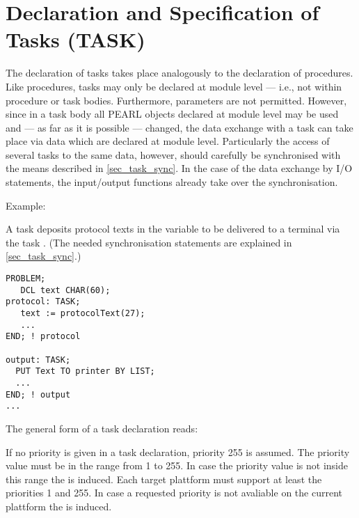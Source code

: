 \section{Declaration and Specification of Tasks (TASK)}   %
\label{sec_task_dcl}

The declaration of tasks takes place analogously to the declaration of
procedures.
Like procedures, tasks may only be declared at
module level --- i.e., not within procedure or task bodies. Furthermore,
parameters are not permitted. However, since in a task body all PEARL
objects declared at module level may be used and --- as far as it is
possible --- changed, the data exchange with a task can take place via
data which are declared at module level. Particularly the access of
several tasks to the same data, however, should carefully be
synchronised with the means described in \ref{sec_task_sync}. In the case of the data 
exchange by I/O statements, the input/output functions
already take over the synchronisation.

Example:

A task  deposits protocol texts in the variable 
 to be
delivered to a terminal via the task .
 (The needed synchronisation
statements are explained in \ref{sec_task_sync}.)

\begin{lstlisting}
PROBLEM;
   DCL text CHAR(60);
protocol: TASK; 
   text := protocolText(27);
   ...
END; ! protocol 

output: TASK;
  PUT Text TO printer BY LIST;
  ...
END; ! output
...
\end{lstlisting}

The general form of a task declaration reads:

\begin{grammarframe}



\end{grammarframe}

If no priority is given in a task declaration, priority 255 is assumed.
The priority value must be in the range from 1 to 255. 
In case the priority value is not inside this range the 
 is induced.
Each target plattform must support at least the priorities 1 and 255.
In case a requested priority is not avaliable on the current 
\OpenPEARL{} plattform
the  is induced.


